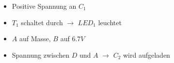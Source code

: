 \begin{frame}
\begin{columns}[c]
\begin{figure}[H]
\begin{center}
    \end{center}
    \end{figure}
    \end{columns}
    \begin{block}{}
         \begin{itemize}
            \item Positive Spannung an $C_1$
            \item $T_1$ schaltet durch $\rightarrow$ $LED_1$ leuchtet
            \item $A$ auf Masse, $B$ auf $6.7V$
            \item Spannung zwischen $D$ und $A$ $\rightarrow$ $C_2$ wird aufgeladen
         \end{itemize}
    \end{block}
\end{frame}

